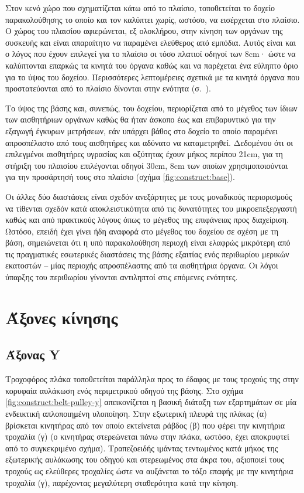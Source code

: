 Στον κενό χώρο που σχηματίζεται κάτω από το πλαίσιο, τοποθετείται το δοχείο
παρακολούθησης το οποίο και τον καλύπτει χωρίς, ωστόσο, να εισέρχεται στο
πλαίσιο. Ο χώρος του πλαισίου αφιερώνεται, εξ ολοκλήρου, στην κίνηση των οργάνων
της συσκευής και είναι απαραίτητο να παραμένει ελεύθερος από εμπόδια. Αυτός
είναι και ο λόγος που έχουν επιλεγεί για το πλαίσιο οι τόσο πλατιοί οδηγοί των
8cm· ώστε να καλύπτονται επαρκώς τα κινητά του όργανα καθώς και να παρέχεται ένα
εύληπτο όριο για το ύψος του δοχείου. Περισσότερες λεπτομέρειες σχετικά με τα
κινητά όργανα που προστατεύονται από το πλαίσιο δίνονται στην ενότητα
 (σ.~\pageref{sec:construct:z-axis}).

Το ύψος της βάσης και, συνεπώς, του δοχείου, περιορίζεται από το μέγεθος των
ίδιων των αισθητήριων οργάνων καθώς θα ήταν άσκοπο έως και επιβαρυντικό για την
εξαγωγή έγκυρων μετρήσεων, εάν υπάρχει βάθος στο δοχείο το οποίο παραμένει
απροσπέλαστο από τους αισθητήρες και αδύνατο να καταμετρηθεί.
Δεδομένου ότι οι επιλεγμένοι αισθητήρες υγρασίας και οξύτητας έχουν μήκος
περίπου 21cm, για τη στήριξη του πλαισίου επιλέγονται οδηγοί 30cm, 8cm των
οποίων χρησιμοποιούνται για την προσάρτησή τους στο πλαίσιο (σχήμα
\ref{fig:construct:base}).

Οι άλλες δύο διαστάσεις είναι σχεδόν ανεξάρτητες με τους μοναδικούς περιορισμούς
να τίθενται σχεδόν κατά αποκλειστικότητα από τις δυνατότητες του
μικροεπεξεργαστή καθώς και από πρακτικούς λόγους όπως το μέγεθος της επιφάνειας
προς διαχείριση.
Ωστόσο, επειδή έχει γίνει ήδη αναφορά στο μέγεθος του δοχείου σε σχέση με τη
βάση, σημειώνεται ότι η υπό παρακολούθηση περιοχή είναι ελαφρώς μικρότερη από
τις πραγματικές εσωτερικές διαστάσεις της βάσης εξαιτίας ενός περιθωρίου μερικών
εκατοστών -- μίας περιοχής απροσπέλαστης από τα αισθητήρια όργανα.
Οι λόγοι ύπαρξης του περιθωρίου γίνονται αντιληπτοί στις επόμενες ενότητες.


\section{Άξονες κίνησης}
\label{sec:construct:axes}


\subsection{Άξονας Y}
\label{subsec:construct:y}

Τροχοφόρος πλάκα τοποθετείται παράλληλα προς το έδαφος με τους τροχούς της στην
κορυφαία αυλάκωση ενός περιμετρικού οδηγού της βάσης. Στο σχήμα
\ref{fig:construct:belt-pulley-y} απεικονίζεται η βασική διάταξη των εξαρτημάτων
σε μία ενδεικτική απλοποιημένη υλοποίηση.
Στην εξωτερική πλευρά της πλάκας (α) βρίσκεται κινητήρας από τον οποίο
εκτείνεται ράβδος (β) που φέρει την κινητήρια τροχαλία (γ) (ο κινητήρας
στερεώνεται πάνω στην πλάκα, ωστόσο, έχει αποκρυφτεί από το συγκεκριμένο σχήμα).
Τραπεζοειδής ιμάντας τεντωμένος κατά μήκος της εξωτερικής αυλάκωσης του οδηγού
και στερεωμένος στα άκρα του, αξιοποιεί τους τροχούς ως ελεύθερες τροχαλίες ώστε
να αυξάνεται το τόξο επαφής με την κινητήρια τροχαλία (γ), παρέχοντας μεγαλύτερη
σταθερότητα κατά την κίνηση.

